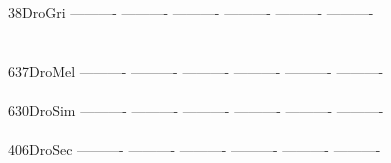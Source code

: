 \documentclass[11pt,twoside,reqno,a4paper]{article}
\begin{document}
{38\hspace*{3\charwidth}DroGri	----------	----------	----------	----------	----------	----------	\\
\hspace*{5\charwidth}\hspace*{7\charwidth}\hspace*{1\charwidth}\hspace*{1\charwidth}\hspace*{1\charwidth}\hspace*{1\charwidth}\hspace*{1\charwidth}\hspace*{1\charwidth}\\
\\
637\hspace*{2\charwidth}DroMel	----------	----------	----------	----------	----------	----------	\\
\hspace*{5\charwidth}\hspace*{7\charwidth}\hspace*{1\charwidth}\hspace*{1\charwidth}\hspace*{1\charwidth}\hspace*{1\charwidth}\hspace*{1\charwidth}\hspace*{1\charwidth}\\
630\hspace*{2\charwidth}DroSim	----------	----------	----------	----------	----------	----------	\\
\hspace*{5\charwidth}\hspace*{7\charwidth}\hspace*{1\charwidth}\hspace*{1\charwidth}\hspace*{1\charwidth}\hspace*{1\charwidth}\hspace*{1\charwidth}\hspace*{1\charwidth}\\
406\hspace*{2\charwidth}DroSec	----------	----------	----------	----------	----------	----------	\\
\hspace*{5\charwidth}\hspace*{7\charwidth}\hspace*{1\charwidth}\hspace*{1\charwidth}\hspace*{1\charwidth}\hspace*{1\charwidth}\hspace*{1\charwidth}\hspace*{1\charwidth}\\
}
\end{document}
